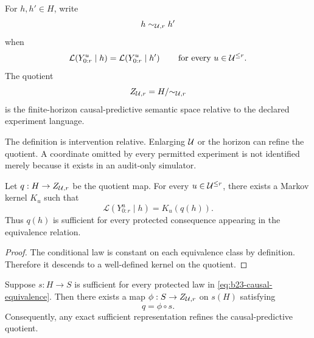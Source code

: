 \begin{definition}
For $h,h'\in H$, write
\begin{equation}
h\sim_{\mathcal U,r}h'
\end{equation}
when
\begin{equation}
\mathcal L\!\left(Y^{u}_{0:r}\mid h\right)
=
\mathcal L\!\left(Y^{u}_{0:r}\mid h'\right)
\qquad
\text{for every }u\in\mathcal U^{\le r}.
\label{eq:b23-causal-equivalence}
\end{equation}
The quotient
\begin{equation}
Z_{\mathcal U,r}=H/{\sim_{\mathcal U,r}}
\label{eq:b23-semantic-quotient}
\end{equation}
is the finite-horizon causal-predictive semantic space relative to the declared experiment language.
\end{definition}

The definition is intervention relative.  Enlarging $\mathcal U$ or the horizon can refine the quotient.  A coordinate omitted by every permitted experiment is not identified merely because it exists in an audit-only simulator.

\begin{proposition}
Let $q:H\to Z_{\mathcal U,r}$ be the quotient map.  For every $u\in\mathcal U^{\le r}$, there exists a Markov kernel $K_u$ such that
\begin{equation}
\mathcal L\!\left(Y^{u}_{0:r}\mid h\right)=K_u(q(h)).
\end{equation}
Thus $q(h)$ is sufficient for every protected consequence appearing in the equivalence relation.
\end{proposition}

\begin{proof}
The conditional law is constant on each equivalence class by definition.  Therefore it descends to a well-defined kernel on the quotient.
\end{proof}

\begin{theorem}
Suppose $s:H\to S$ is sufficient for every protected law in \cref{eq:b23-causal-equivalence}.  Then there exists a map $\phi:S\to Z_{\mathcal U,r}$ on $s(H)$ satisfying
\begin{equation}
q=\phi\circ s.
\label{eq:b23-minimal-factorization}
\end{equation}
Consequently, any exact sufficient representation refines the causal-predictive quotient.
\end{theorem}

